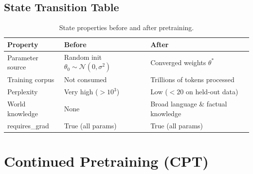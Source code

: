\subsection{State Transition Table}
\begin{table}[h]\centering
\begin{tabular}{lll}\toprule
\textbf{Property} & \textbf{Before} & \textbf{After}\\\midrule
Parameter source & Random init $\theta_0 \sim \mathcal{N}(0,\sigma^2)$ & Converged weights $\theta^*$\\
Training corpus & Not consumed & Trillions of tokens processed\\
Perplexity & Very high ($>10^3$) & Low ($<20$ on held-out data)\\
World knowledge & None & Broad language \& factual knowledge\\
requires\_grad & True (all params) & True (all params)\\\bottomrule
\end{tabular}
\caption{State properties before and after pretraining.}
\end{table}

\newpage
\section{Continued Pretraining (CPT)}

